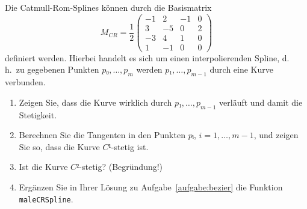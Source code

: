 %
Die Catmull-Rom-Splines können durch die Basismatrix
\[ M_{CR} = \frac12
\begin{pmatrix}
  -1 &  2 & -1 & 0 \\
   3 & -5 &  0 & 2 \\
  -3 &  4 &  1 & 0 \\
   1 & -1 &  0 & 0
\end{pmatrix} \]
definiert werden. Hierbei handelt es sich um einen interpolierenden
Spline, d.\,h.\ zu gegebenen Punkten $p₀, …, p_m$ werden
$p₁, …, p_{m-1}$ durch eine Kurve verbunden.
\begin{enumerate}
  \item Zeigen Sie, dass die Kurve wirklich durch $p₁, …, p_{m-1}$ 
        verläuft und damit die Stetigkeit.
  \item Berechnen Sie die Tangenten in den Punkten $pᵢ$,
        $i = 1, …, m - 1$, und zeigen Sie so, dass die Kurve $C¹$-stetig
        ist.
  \item Ist die Kurve $C²$-stetig? (Begründung!)
  \item Ergänzen Sie in Ihrer Lösung zu Aufgabe~\ref{aufgabe:bezier} die
        Funktion \texttt{maleCRSpline}.
\end{enumerate} 
